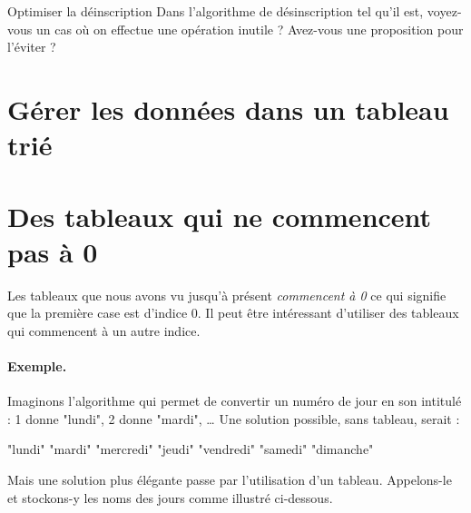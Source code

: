 			\begin{Exercice}{Optimiser la déinscription}
				Dans l'algorithme de désinscription tel qu'il est,
				voyez-vous un cas où on effectue une opération inutile ?
				Avez-vous une proposition pour l'éviter ?
			\end{Exercice}

	\section{Gérer les données dans un tableau trié} 

	\section{Des tableaux qui ne commencent pas à 0} 

		Les tableaux que nous avons vu jusqu'à présent
		\emph{commencent à 0}
		ce qui signifie que la première case est d'indice 0.
		Il peut être intéressant d'utiliser des tableaux
		qui commencent à un autre indice.
		
		\paragraph{Exemple.}
		Imaginons l'algorithme qui permet de convertir un numéro
		de jour en son intitulé : 1 donne "lundi", 2 donne "mardi",
		\dots{}
		Une solution possible, sans tableau, serait :
		
		\begin{LDA}
				 \algorithmicreturn{} "lundi"
				 \algorithmicreturn{} "mardi"
				 \algorithmicreturn{} "mercredi"
				 \algorithmicreturn{} "jeudi"
				 \algorithmicreturn{} "vendredi"
				 \algorithmicreturn{} "samedi"
				 \algorithmicreturn{} "dimanche"
				\EndSwitch
			\EndAlgo
		\end{LDA}
		
		Mais une solution plus élégante passe par l'utilisation d'un tableau.
		Appelons-le  et stockons-y les noms des jours
		comme illustré ci-dessous.

